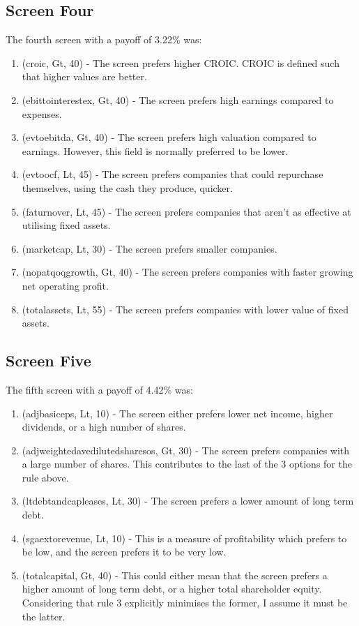 \subsection{Screen Four}
The fourth screen with a payoff of 3.22\% was:
\begin{enumerate}
    \item (croic, Gt, 40) - The screen prefers higher CROIC. CROIC is defined such that higher values are better.
    \item (ebittointerestex, Gt, 40) - The screen prefers high earnings compared to expenses.
    \item (evtoebitda, Gt, 40) - The screen prefers high valuation compared to earnings. However, this field is normally preferred to be lower.
    \item (evtoocf, Lt, 45) - The screen prefers companies that could repurchase themselves, using the cash they produce, quicker.
    \item (faturnover, Lt, 45) - The screen prefers companies that aren't as effective at utilising fixed assets.
    \item (marketcap, Lt, 30) - The screen prefers smaller companies.
    \item (nopatqoqgrowth, Gt, 40) - The screen prefers companies with faster growing net operating profit.
    \item (totalassets, Lt, 55) - The screen prefers companies with lower value of fixed assets.
\end{enumerate}

\subsection{Screen Five}
The fifth screen with a payoff of 4.42\% was:
\begin{enumerate}
    \item (adjbasiceps, Lt, 10) - The screen either prefers lower net income, higher dividends, or a high number of shares.
    \item (adjweightedavedilutedsharesos, Gt, 30) - The screen prefers companies with a large number of shares. This contributes to the last of the 3 options for the rule above.
    \item (ltdebtandcapleases, Lt, 30) - The screen prefers a lower amount of long term debt.
    \item (sgaextorevenue, Lt, 10) - This is a measure of profitability which prefers to be low, and the screen prefers it to be very low.
    \item (totalcapital, Gt, 40) - This could either mean that the screen prefers a higher amount of long term debt, or a higher total shareholder equity. Considering that rule 3 explicitly minimises the former, I assume it must be the latter.
\end{enumerate}

